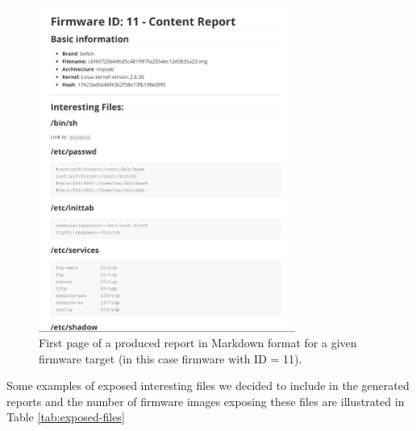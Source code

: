\begin{figure}[h]
    \centering
    \includegraphics[width=0.75\textwidth]{figs/REPORT.png}
    \caption{First page of a produced report in Markdown format for a given firmware target (in this case firmware with ID = 11).}
    \label{fig:automatic-report}
\end{figure}

Some examples of exposed interesting files we decided to include in the generated reports and the number of firmware images exposing these files are illustrated in Table \ref{tab:exposed-files}

